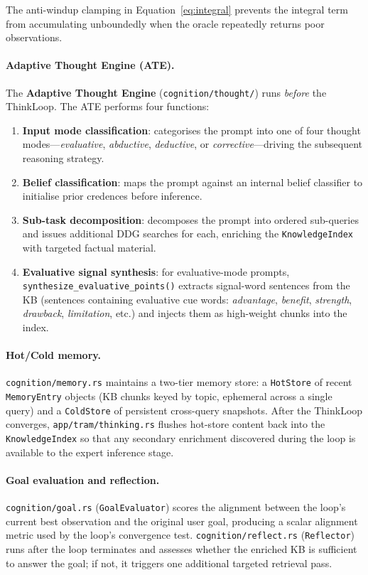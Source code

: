 \documentclass[11pt,a4paper]{article}
\begin{document}
The anti-windup clamping in Equation~\eqref{eq:integral} prevents the integral term from
accumulating unboundedly when the oracle repeatedly returns poor observations.

\paragraph{Adaptive Thought Engine (ATE).}
The \textbf{Adaptive Thought Engine} (\texttt{cognition/thought/}) runs \emph{before} the ThinkLoop.
The ATE performs four functions:
\begin{enumerate}[noitemsep,topsep=4pt]
  \item \textbf{Input mode classification}: categorises the prompt into one of four thought
        modes---\textit{evaluative}, \textit{abductive}, \textit{deductive}, or
        \textit{corrective}---driving the subsequent reasoning strategy.
  \item \textbf{Belief classification}: maps the prompt against an internal belief classifier
        to initialise prior credences before inference.
  \item \textbf{Sub-task decomposition}: decomposes the prompt into ordered sub-queries and
        issues additional DDG searches for each, enriching the \texttt{KnowledgeIndex} with
        targeted factual material.
  \item \textbf{Evaluative signal synthesis}: for evaluative-mode prompts,
        \texttt{synthesize\_evaluative\_points()} extracts signal-word sentences from the KB
        (sentences containing evaluative cue words: \textit{advantage}, \textit{benefit},
        \textit{strength}, \textit{drawback}, \textit{limitation}, etc.) and injects them as
        high-weight chunks into the index.
\end{enumerate}

\paragraph{Hot/Cold memory.}
\texttt{cognition/memory.rs} maintains a two-tier memory store: a \texttt{HotStore} of recent
\texttt{MemoryEntry} objects (KB chunks keyed by topic, ephemeral across a single query) and a
\texttt{ColdStore} of persistent cross-query snapshots. After the ThinkLoop converges,
\texttt{app/tram/thinking.rs} flushes hot-store content back into the \texttt{KnowledgeIndex}
so that any secondary enrichment discovered during the loop is available to the expert inference
stage.

\paragraph{Goal evaluation and reflection.}
\texttt{cognition/goal.rs} (\texttt{GoalEvaluator}) scores the alignment between the loop's
current best observation and the original user goal, producing a scalar alignment metric used by
the loop's convergence test. \texttt{cognition/reflect.rs} (\texttt{Reflector}) runs after the
loop terminates and assesses whether the enriched KB is sufficient to answer the goal; if not,
it triggers one additional targeted retrieval pass.
\end{document}
